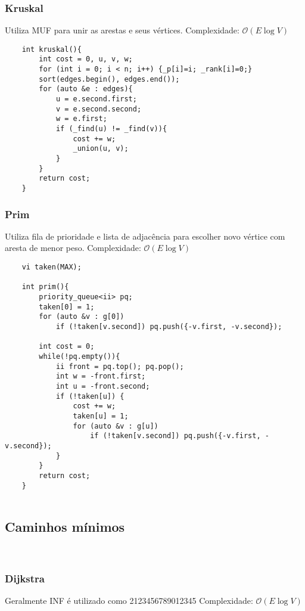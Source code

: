 \subsubsection{Kruskal}
Utiliza MUF para unir as arestas e seus vértices.
Complexidade: $\mathcal{O}(E\log V)$
\begin{verbatim}
    int kruskal(){
        int cost = 0, u, v, w;
        for (int i = 0; i < n; i++) {_p[i]=i; _rank[i]=0;}
        sort(edges.begin(), edges.end());
        for (auto &e : edges){
            u = e.second.first;
            v = e.second.second;
            w = e.first;
            if (_find(u) != _find(v)){
                cost += w;
                _union(u, v);
            }
        }
        return cost;
    }

\end{verbatim}
\subsubsection{Prim}
\par Utiliza fila de prioridade e lista de adjacência para escolher novo vértice com aresta de menor peso.
Complexidade: $\mathcal{O}(E\log V)$

\begin{verbatim}
    vi taken(MAX);

    int prim(){
        priority_queue<ii> pq;
        taken[0] = 1;
        for (auto &v : g[0])
            if (!taken[v.second]) pq.push({-v.first, -v.second});  
    
        int cost = 0;
        while(!pq.empty()){
            ii front = pq.top(); pq.pop();
            int w = -front.first;
            int u = -front.second;
            if (!taken[u]) {
                cost += w;
                taken[u] = 1;
                for (auto &v : g[u])
                    if (!taken[v.second]) pq.push({-v.first, -v.second});  
            }
        }
        return cost;
    }
    
\end{verbatim}
\subsection{Caminhos mínimos}\

\subsubsection{Dijkstra}
Geralmente INF é utilizado como 2123456789012345
Complexidade: $\mathcal{O}(E\log V)$

